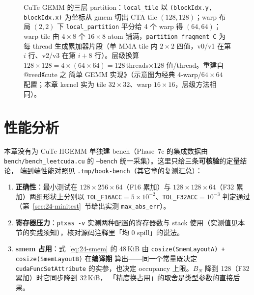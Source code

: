 \begin{figure}[htbp]
\caption{CuTe GEMM 的三层 partition：\texttt{local\_tile} 以 \texttt{\allowbreak{}(block\allowbreak{}Idx.\allowbreak{}y,\allowbreak{} block\allowbreak{}Idx.\allowbreak{}x)} 为坐标从 gmem 切出 CTA tile $(128,128)$；warp 布局 $(2,2)$ 下 \texttt{local\_\allowbreak{}partition} 平分给 4 个 warp 得 $(64,64)$；warp tile 由 $4\times8$ 个 $16\times8$ atom 铺满，\texttt{partition\_\allowbreak{}fragment\_\allowbreak{}C} 为每 thread 生成累加器片段（单 MMA tile 内 $2\times2$ 四值，v0/v1 在第 $i$ 行、v2/v3 在第 $i+8$ 行）。层级换算 $128\times128=4\times(64\times64)=128$\,threads$\times128$ 值/thread。重建自 @reed《cute 之 简单 GEMM 实现》（示意图为经典 4-warp/$64\times64$ 配置；本章 kernel 实为 tile $32\times32$、warp $16\times16$，层级方法相同）。}
\label{fig:24-3}
\end{figure}

\section{性能分析}

本章没有为 CuTe HGEMM 单独建 bench（Phase~7c 的集成数据由 \texttt{bench/bench\_leetcuda.cu}
的 \texttt{--bench} 统一采集）。这里只给三条\textbf{可核验}的定量结论，
端到端性能对照见 \texttt{.\allowbreak{}tmp/\allowbreak{}book-bench}（其它章的复测汇总）：

\begin{enumerate}
  \item \textbf{正确性}：最小测试在 $128\times256\times64$（F16 累加）与
        $128\times128\times64$（F32 累加）两组形状上分别以
        \texttt{TOL\_F16ACC}$=5\times10^{-2}$、\texttt{TOL\_F32ACC}$=10^{-3}$
        判定通过（第~\ref{sec:24-minitest}~节给出实测 \texttt{max\_abs\_err}）。
  \item \textbf{寄存器压力}：\texttt{ptxas -v} 实测两种配置的寄存器数与 stack
        使用（实测值见本节的实践须知），核对源码注释里「均 0 spill」的说法。
  \item \textbf{smem 占用}：式~\eqref{eq:24-smem} 的 48\,KiB 由
        \texttt{cosize\allowbreak{}(Smem\allowbreak{}Layout\allowbreak{}A) + cosize\allowbreak{}(Smem\allowbreak{}Layout\allowbreak{}B)} 在\textbf{编译期}
        算出——同一个常量既决定 \texttt{cuda\allowbreak{}Func\allowbreak{}Set\allowbreak{}Attribute} 的实参，也决定
        occupancy 上限。$B_N$ 降到 128（F32 累加）时它同步降到 32\,KiB，
        「精度换占用」的取舍是类型参数的直接后果。
\end{enumerate}


